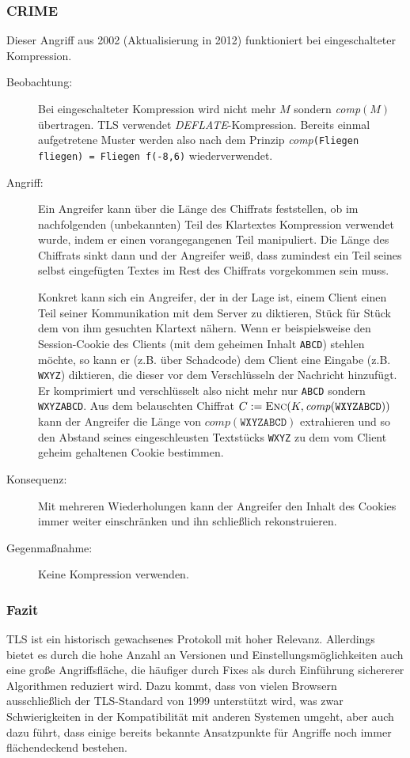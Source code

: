 \subsubsection{CRIME}
\label{sec:keyex:crime}
Dieser Angriff aus 2002 (Aktualisierung in 2012) funktioniert bei eingeschalteter Kompression.
\begin{description}
	\item[Beobachtung:] Bei eingeschalteter Kompression wird nicht mehr $M$ sondern \emph{comp}$(M)$ übertragen. TLS verwendet
	\emph{DEFLATE}-Kompression. Bereits einmal aufgetretene Muster werden also nach dem Prinzip \emph{comp}\texttt{(Fliegen fliegen) = Fliegen
	f(-8,6)} wiederverwendet.
	\item[Angriff:] Ein Angreifer kann über die Länge des Chiffrats feststellen, ob im nachfolgenden (unbekannten) Teil des Klartextes Kompression
	verwendet wurde, indem er einen vorangegangenen Teil manipuliert. Die Länge des Chiffrats sinkt dann und der Angreifer weiß, dass zumindest ein Teil seines
	selbst eingefügten Textes im Rest des Chiffrats vorgekommen sein muss.
	
	Konkret kann sich ein Angreifer, der in der Lage ist, einem Client einen Teil seiner Kommunikation mit dem Server zu diktieren, Stück für
	Stück dem von ihm gesuchten Klartext nähern. Wenn er beispielsweise den Session-Cookie des Clients (mit dem geheimen Inhalt
	\texttt{ABCD}) stehlen möchte, so kann er (z.B. über Schadcode) dem Client eine Eingabe (z.B. \texttt{WXYZ}) diktieren, die dieser vor dem
	Verschlüsseln der Nachricht hinzufügt. Er komprimiert und verschlüsselt also nicht mehr nur \texttt{ABCD} sondern \texttt{WXYZABCD}. Aus
	dem belauschten Chiffrat $C := \textsc{Enc}(K, \mathit{comp}(\mathtt{WXYZABCD}))$ kann der Angreifer die Länge von
	$\mathit{comp}(\mathtt{WXYZABCD})$ extrahieren und so den Abstand seines eingeschleusten Textstücks \texttt{WXYZ} zu dem vom Client geheim
	gehaltenen Cookie bestimmen. 
	\item[Konsequenz:] Mit mehreren Wiederholungen kann der Angreifer den Inhalt des Cookies immer weiter einschränken und ihn schließlich
	rekonstruieren.
	\item[Gegenmaßnahme:] Keine Kompression verwenden.
\end{description}

\subsubsection{Fazit}
TLS ist ein historisch gewachsenes Protokoll mit hoher Relevanz. Allerdings bietet es durch die hohe Anzahl an Versionen und
Einstellungsmöglichkeiten auch eine große Angriffsfläche, die häufiger durch Fixes als durch Einführung sichererer Algorithmen reduziert
wird. Dazu kommt, dass von vielen Browsern ausschließlich der TLS-Standard von 1999 unterstützt wird, was zwar Schwierigkeiten in der
Kompatibilität mit anderen Systemen umgeht, aber auch dazu führt, dass einige bereits bekannte Ansatzpunkte für Angriffe
noch immer flächendeckend bestehen.

